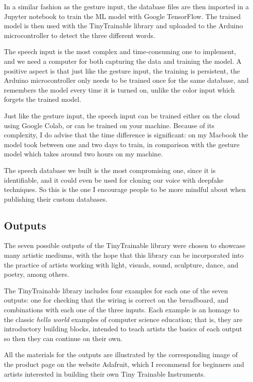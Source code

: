 In a similar fashion as the gesture input, the database files are then imported in a Jupyter notebook to train the \acrshort{ML} model with Google TensorFlow. The trained model is then used with the TinyTrainable library and uploaded to the Arduino microcontroller to detect the three different words.

The speech input is the most complex and time-consuming one to implement, and we need a computer for both capturing the data and training the model. A positive aspect is that just like the gesture input, the training is persistent, the Arduino microcontroller only needs to be trained once for the same database, and remembers the model every time it is turned on, unlike the color input which forgets the trained model.

Just like the gesture input, the speech input can be trained either on the cloud using Google Colab, or can be trained on your machine. Because of its complexity, I do advise that the time difference is significant: on my Macbook the model took between one and two days to train, in comparison with the gesture model which takes around two hours on my machine.

The speech database we built is the most compromising one, since it is identifiable, and it could even be used for cloning our voice with deepfake techniques. So this is the one I encourage people to be more mindful about when publishing their custom databases.

\subsection{Outputs}

The seven possible outputs of the TinyTrainable library were chosen to showcase many artistic mediums, with the hope that this library can be incorporated into the practice of artists working with light, visuals, sound, sculpture, dance, and poetry, among others.

The TinyTrainable library includes four examples for each one of the seven outputs: one for checking that the wiring is correct on the breadboard, and combinations with each one of the three inputs. Each example is an homage to the classic \emph{hello world} examples of computer science education; that is, they are introductory building blocks, intended to teach artists the basics of each output so then they can continue on their own.

All the materials for the outputs are illustrated by the corresponding image of the product page on the website Adafruit, which I recommend for beginners and artists interested in building their own Tiny Trainable Instruments.

